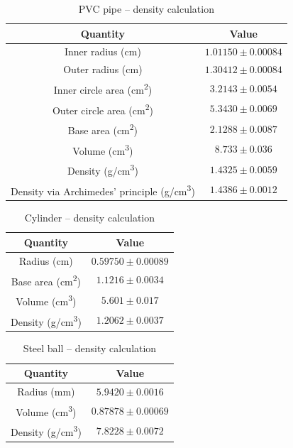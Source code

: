 \begin{table}[htb!]
\centering
\caption{PVC pipe -- density calculation}
\begin{tabular}{cc}
\toprule
Quantity & Value \\
\midrule
Inner radius (\unit{\cm}) & $1.01150 \pm 0.00084$ \\
Outer radius (\unit{\cm}) & $1.30412 \pm 0.00084$ \\
Inner circle area (\unit{\square\cm}) & $3.2143 \pm 0.0054$ \\
Outer circle area (\unit{\square\cm}) & $5.3430 \pm 0.0069$ \\
Base area (\unit{\square\cm}) & $2.1288 \pm 0.0087$ \\
Volume (\unit{\cubic\cm}) & $8.733 \pm 0.036$ \\
Density (\unit{\g/\cubic\cm}) & $1.4325 \pm 0.0059$ \\
Density via Archimedes' principle (\unit{\g/\cubic\cm}) & $1.4386 \pm 0.0012$ \\
\bottomrule
\end{tabular}
\end{table}
\begin{table}[htb!]
\centering
\caption{Cylinder -- density calculation}
\begin{tabular}{cc}
\toprule
Quantity & Value \\
\midrule
Radius (\unit{\cm}) & $0.59750 \pm 0.00089$ \\
Base area (\unit{\square\cm}) & $1.1216 \pm 0.0034$ \\
Volume (\unit{\cubic\cm}) & $5.601 \pm 0.017$ \\
Density (\unit{\g/\cubic\cm}) & $1.2062 \pm 0.0037$ \\
\bottomrule
\end{tabular}
\end{table}
\begin{table}[htb!]
\centering
\caption{Steel ball -- density calculation}
\begin{tabular}{cc}
\toprule
Quantity & Value \\
\midrule
Radius (\unit{\mm}) & $5.9420 \pm 0.0016$ \\
Volume (\unit{\cubic\cm}) & $0.87878 \pm 0.00069$ \\
Density (\unit{\g/\cubic\cm}) & $7.8228 \pm 0.0072$ \\
\bottomrule
\end{tabular}
\end{table}
